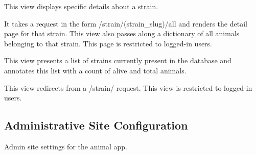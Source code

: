 \documentclass[letterpaper,10pt,english]{sphinxmanual}
\begin{document}

\begin{fulllineitems}
\label{api:animal.views.strain_detail_all}
This view displays specific details about a strain.

It takes a request in the form /strain/(strain\_slug)/all and renders the detail page for that strain.
This view also passes along a dictionary of all animals belonging to that strain.
This page is restricted to logged-in users.

\end{fulllineitems}



\begin{fulllineitems}
\label{api:animal.views.strain_list}
This view presents a list of strains currently present in the database and annotates this list with a count of alive and total animals.

This view redirects from a /strain/ request.
This view is restricted to logged-in users.

\end{fulllineitems}

\label{api:module-animal.urls}

\subsection{Administrative Site Configuration}
\label{api:id4}\label{api:module-animal.admin}
Admin site settings for the animal app.

\end{document}
